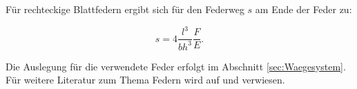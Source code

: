 Für rechteckige Blattfedern ergibt sich für den Federweg $s$ am Ende der Feder zu: 

\begin{equation}
s = 4 \frac{l^3}{b h^3} \frac{F}{E}.
\label{eq:Federweg}
\end{equation}



Die Auslegung für die verwendete Feder erfolgt im Abschnitt \ref{sec:Waegesystem}. Für weitere Literatur zum Thema Federn wird auf \citep{Wittel2011} und \citep{Ettemeyer2007} verwiesen. 
